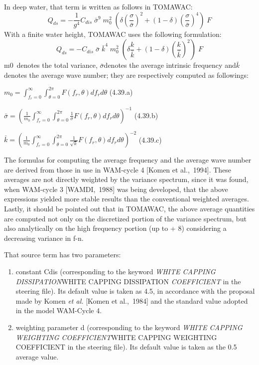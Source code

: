 In deep water, that term is written as follows in TOMAWAC:
\begin{equation} \label{GrindEQ__4_37_}
Q_{ds} =-\frac{1}{g^{4} } C_{dis} \; \bar{\sigma }^{9} \; m_{0}^{2} \; \left(\delta \left(\frac{\sigma }{\bar{\sigma }} \right)^{2} +(1-\delta )\left(\frac{\sigma }{\bar{\sigma }} \right)^{4} \right)\; F
\end{equation}
With a finite water height, TOMAWAC uses the following formulation:
\begin{equation} \label{GrindEQ__4_38_}
Q_{ds} =-C_{dis} \; \bar{\sigma }\; \bar{k}^{4} \; m_{0}^{2} \; \left(\delta \frac{k}{\bar{k}} +(1-\delta )\left(\frac{k}{\bar{k}} \right)^{2} \right)\; F
\end{equation}
m0~denotes the total variance, $\bar{\sigma }$denotes the average intrinsic frequency and$\bar{k}$ denotes the average wave number; they are respectively computed as followings:

$m_{0} =\int _{f_{r} =0}^{\infty }\int _{\theta =0}^{2\pi }  F(f_{r} ,\theta )df_{r} d\theta $ (4.39.a)

$\bar{\sigma }=\left(\frac{1}{m_{0} } \int _{f_{r} =0}^{\infty }\int _{\theta =0}^{2\pi } \frac{1}{\sigma }  F(f_{r} ,\theta )df_{r} d\theta \right)^{-1} $ (4.39.b)

$\bar{k}=\left(\frac{1}{m_{0} } \int _{f_{r} =0}^{\infty }\int _{\theta =0}^{2\pi } \frac{1}{\sqrt{k} }  F(f_{r} ,\theta )df_{r} d\theta \right)^{-2} $ (4.39.c)

 The formulas for computing the average frequency and the average wave number are derived from those in use in WAM-cycle 4 [Komen et al.,~1994]. These averages are not directly weighted by the variance spectrum, since it was found, when WAM-cycle 3 [WAMDI,~1988] was being developed, that the above expressions yielded more stable results than the conventional weighted averages. Lastly, it should be pointed out that in TOMAWAC, the above average quantities are computed not only on the discretized portion of the variance spectrum, but also analytically on the high frequency portion (up to + 8) considering a decreasing variance in f-n.

That source term has two parameters:

\begin{enumerate}
\item  constant Cdis (corresponding to the keyword \textit{WHITE CAPPING DISSIPATION}WHITE CAPPING DISSIPATION\textit{ COEFFICIENT }in the steering file). Its default value is taken as 4.5, in accordance with the proposal made by Komen \textit{et al.} [Komen et al.,~1984] and the standard value adopted in the model WAM-Cycle 4.

\item  weighting parameter d (corresponding to the keyword \textit{WHITE CAPPING WEIGHTING COEFFICIENT}WHITE CAPPING WEIGHTING COEFFICIENT\textit{ }in the steering file). Its default value is taken as the 0.5 average value.
\end{enumerate}



